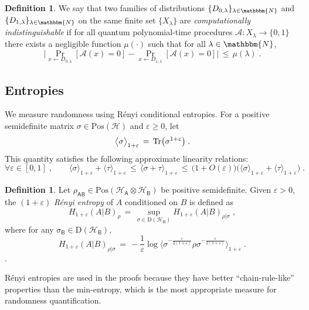 \documentclass[11pt]{article}
\theoremstyle{remark}
\theoremstyle{definition}
\newtheorem{definition}[theorem]{Definition}
\newcommand{\Tr}{\mbox{\rm Tr}}
\newcommand{\reg}[1]{{\textsf{#1}}}
\newcommand{\mH}{\mathcal{H}}
\newcommand{\setft}[1]{\mathrm{#1}}
\newcommand{\Density}{\setft{D}}
\newcommand{\Pos}{\setft{Pos}}
\newcommand{\eps}{\varepsilon}
\newcommand{\mN}{\mathbbm{N}}
\begin{document}
\begin{definition}\label{def:compinddist}
We say that two families of distributions $\{D_{0,\lambda}\}_{\lambda\in\mN}$ and $\{D_{1,\lambda}\}_{\lambda\in\mN}$ on the same finite set $\{X_\lambda\}$ are \emph{computationally indistinguishable} if for all quantum polynomial-time procedures $\mathcal{A}:X_\lambda\to\{0,1\}$ there exists a negligible function $\mu(\cdot)$ such that for all $\lambda\in\mN$,
\begin{equation}
\Big|\Pr_{x\leftarrow D_{0,\lambda}}[\mathcal{A}(x) = 0] - \Pr_{x\leftarrow D_{1,\lambda}}[\mathcal{A}(x) = 0]\Big| \,\leq\, \mu(\lambda)\;.
\end{equation}
\end{definition}




\subsection{Entropies}

We measure randomness using R\'enyi conditional entropies. For a positive semidefinite matrix $\sigma\in\Pos(\mH)$ and $\eps\geq 0$, let 
$$\big\langle \sigma \big\rangle_{1+\eps} \,=\, \Tr \big(\sigma^{1+\eps}\big)\;.$$
This quantity satisfies the following approximate linearity relations:
\begin{equation}\label{eq:approx-lin}
 \forall\eps\in[0,1]\;,\qquad\langle \sigma \rangle_{1+\eps} + \langle \tau \rangle_{1+\eps} \,\leq\, \langle \sigma + \tau \rangle_{1+\eps} \,\leq\, \big(1+O(\eps)\big) \big( \langle \sigma \rangle_{1+\eps}+\langle \tau \rangle_{1+\eps}\big)\;.
\end{equation}

\begin{definition}\label{def:renyi}
Let $\rho_\reg{AB} \in \Pos(\mH_\reg{A}\otimes \mH_\reg{B})$ be positive semidefinite.  Given $\eps >0$, the $(1+\eps)$ \emph{R\'enyi entropy} of $A$ conditioned on $B$ is defined as 
$$H_{1+\eps}(A|B)_{\rho} \,=\, \sup_{\sigma\in\Density(\mH_\reg{B})} H_{1+\eps}(A|B)_{\rho|\sigma}\;,$$
where for any  $\sigma_\reg{B}\in\Density(\mH_\reg{B})$,
$$H_{1+\eps}(A|B)_{\rho|\sigma} \,=\, -\frac{1}{\eps} \log \big\langle \sigma^{-\frac{\eps}{2(1+\eps)}}\rho\sigma^{-\frac{\eps}{2(1+\eps)}}\big\rangle_{1+\eps}\;.$$.
\end{definition}

R\'enyi entropies are used in the proofs because they have better ``chain-rule-like'' properties than the min-entropy, which is the most appropriate measure for randomness quantification. 
\end{document}
